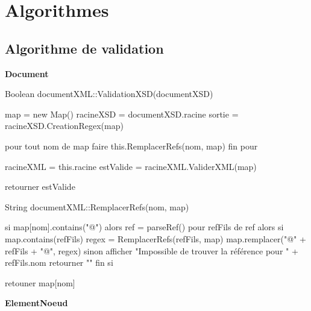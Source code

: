 \section{Algorithmes}

\subsection{Algorithme de validation}

\textbf{Document}

\begin{verbatimtab}
Boolean documentXML::ValidationXSD(documentXSD) {

	map = new Map()
	racineXSD = documentXSD.racine
	sortie = racineXSD.CreationRegex(map)

	pour tout nom de map faire
		this.RemplacerRefs(nom, map)
	fin pour

	racineXML = this.racine
	estValide = racineXML.ValiderXML(map)
	
	retourner estValide
}

\end{verbatimtab}

\begin{verbatimtab}
String documentXML::RemplacerRefs(nom, map) {

    si map[nom].contains("@") alors
        ref = parseRef()
        pour refFils de ref alors 
            si map.contains(refFils)
                regex = RemplacerRefs(refFils, map)
                map.remplacer("@" + refFils + "@", regex)
            sinon
                afficher "Impossible de trouver la référence pour " + refFils.nom
                retourner ""
            fin si
    
    retouner map[nom]
}

\end{verbatimtab}

\textbf{ElementNoeud}

